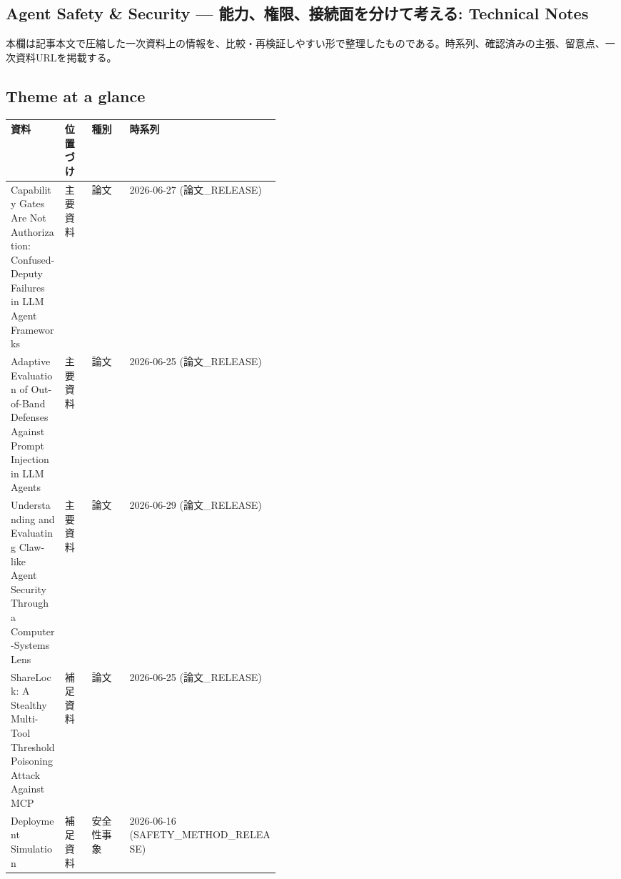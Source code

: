 \subsection*{Agent Safety \& Security — 能力、権限、接続面を分けて考える: Technical Notes}
本欄は記事本文で圧縮した一次資料上の情報を、比較・再検証しやすい形で整理したものである。時系列、確認済みの主張、留意点、一次資料URLを掲載する。
\medskip
\subsection*{Theme at a glance}
\begin{center}
\footnotesize
\begin{tabularx}{\linewidth}{@{}p{0.20\linewidth}p{0.10\linewidth}p{0.14\linewidth}X@{}}
\toprule
資料 & 位置づけ & 種別 & 時系列 \\
\midrule
Capability Gates Are Not Authorization: Confused-Deputy Failures in LLM Agent Frameworks & 主要資料 & 論文 & 2026-06-27 (論文\_RELEASE) \\
Adaptive Evaluation of Out-of-Band Defenses Against Prompt Injection in LLM Agents & 主要資料 & 論文 & 2026-06-25 (論文\_RELEASE) \\
Understanding and Evaluating Claw-like Agent Security Through a Computer-Systems Lens & 主要資料 & 論文 & 2026-06-29 (論文\_RELEASE) \\
ShareLock: A Stealthy Multi-Tool Threshold Poisoning Attack Against MCP & 補足資料 & 論文 & 2026-06-25 (論文\_RELEASE) \\
Deployment Simulation & 補足資料 & 安全性事象 & 2026-06-16 (SAFETY\_METHOD\_RELEASE) \\
\bottomrule
\end{tabularx}
\end{center}
\normalsize

